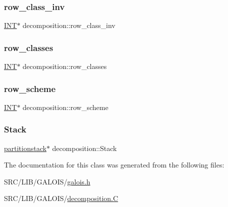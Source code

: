 \subsubsection{\texorpdfstring{row\+\_\+class\+\_\+inv}{row\_class\_inv}}
{\footnotesize\ttfamily \mbox{\hyperlink{galois_8h_a09fddde158a3a20bd2dcadb609de11dc}{I\+NT}}$\ast$ decomposition\+::row\+\_\+class\+\_\+inv}

\mbox{\label{classdecomposition_a37b2b27b258e8732dcbd9192a8ba0b86}} 
\subsubsection{\texorpdfstring{row\+\_\+classes}{row\_classes}}
{\footnotesize\ttfamily \mbox{\hyperlink{galois_8h_a09fddde158a3a20bd2dcadb609de11dc}{I\+NT}}$\ast$ decomposition\+::row\+\_\+classes}

\mbox{\label{classdecomposition_a15874e1658c73e50022551bb652b0838}} 
\subsubsection{\texorpdfstring{row\+\_\+scheme}{row\_scheme}}
{\footnotesize\ttfamily \mbox{\hyperlink{galois_8h_a09fddde158a3a20bd2dcadb609de11dc}{I\+NT}}$\ast$ decomposition\+::row\+\_\+scheme}

\mbox{\label{classdecomposition_a696d052f5b11b84c8a417529bc41db7f}} 
\subsubsection{\texorpdfstring{Stack}{Stack}}
{\footnotesize\ttfamily \mbox{\hyperlink{classpartitionstack}{partitionstack}}$\ast$ decomposition\+::\+Stack}



The documentation for this class was generated from the following files\+:\begin{DoxyCompactItemize}
\item 
S\+R\+C/\+L\+I\+B/\+G\+A\+L\+O\+I\+S/\mbox{\hyperlink{galois_8h}{galois.\+h}}\item 
S\+R\+C/\+L\+I\+B/\+G\+A\+L\+O\+I\+S/\mbox{\hyperlink{_g_a_l_o_i_s_2decomposition_8_c}{decomposition.\+C}}\end{DoxyCompactItemize}
